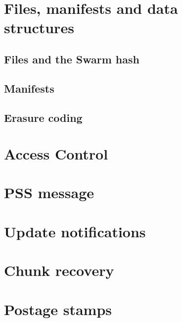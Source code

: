 \section{Files, manifests and data structures}\label{spec:format:data-structures}
\subsection{Files and the Swarm hash \statusyellow}\label{spec:format:files}

\subsection{Manifests \statusyellow}\label{spec:format:manifests}

\subsection{Erasure coding \statusred}\label{spec:format:erasure}

%

\section{Access Control \statusred}\label{spec:format:access-control}


\section{PSS message \statusyellow}\label{spec:format:pss-messsage}

\section{Update notifications}\label{spec:format:update-notifications}
%

\section{Chunk recovery  \statusred}\label{spec:format:recovery}


\section{Postage stamps \statusorange}\label{spec:format:postage-stamps}

%


